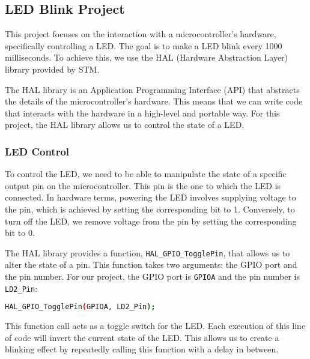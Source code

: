 \subsection{LED Blink Project}

This project focuses on the interaction with a microcontroller's hardware, specifically controlling a LED. The goal is to make a LED blink every 1000 milliseconds. To achieve this, we use the HAL (Hardware Abstraction Layer) library provided by STM.

The HAL library is an Application Programming Interface (API) that abstracts the details of the microcontroller's hardware. This means that we can write code that interacts with the hardware in a high-level and portable way. For this project, the HAL library allows us to control the state of a LED.

\subsubsection{LED Control}

To control the LED, we need to be able to manipulate the state of a specific output pin on the microcontroller. This pin is the one to which the LED is connected. In hardware terms, powering the LED involves supplying voltage to the pin, which is achieved by setting the corresponding bit to 1. Conversely, to turn off the LED, we remove voltage from the pin by setting the corresponding bit to 0.

The HAL library provides a function, \texttt{HAL\_GPIO\_TogglePin}, that allows us to alter the state of a pin. This function takes two arguments: the GPIO port and the pin number. For our project, the GPIO port is \texttt{GPIOA} and the pin number is \texttt{LD2\_Pin}:

\begin{codebox}
\begin{lstlisting}[language=bash]
    HAL_GPIO_TogglePin(GPIOA, LD2_Pin);
\end{lstlisting}
\end{codebox}

This function call acts as a toggle switch for the LED. Each execution of this line of code will invert the current state of the LED. This allows us to create a blinking effect by repeatedly calling this function with a delay in between.
